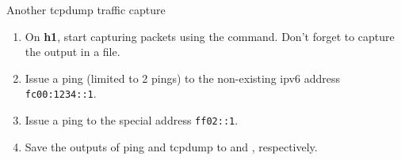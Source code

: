 \begin{exercise}{Another tcpdump traffic capture}
\begin{enumerate}
	\item On \textbf{h1}, start capturing packets using the  command. Don't forget to capture the output in a file.
	\item Issue a ping (limited to 2 pings) to the non-existing \ac{ipv6} address \texttt{fc00:1234::1}.
	\item Issue a ping to the special address \texttt{ff02::1}.
	\item Save the outputs of ping and tcpdump to  and , respectively.
\end{enumerate}
\end{exercise}

